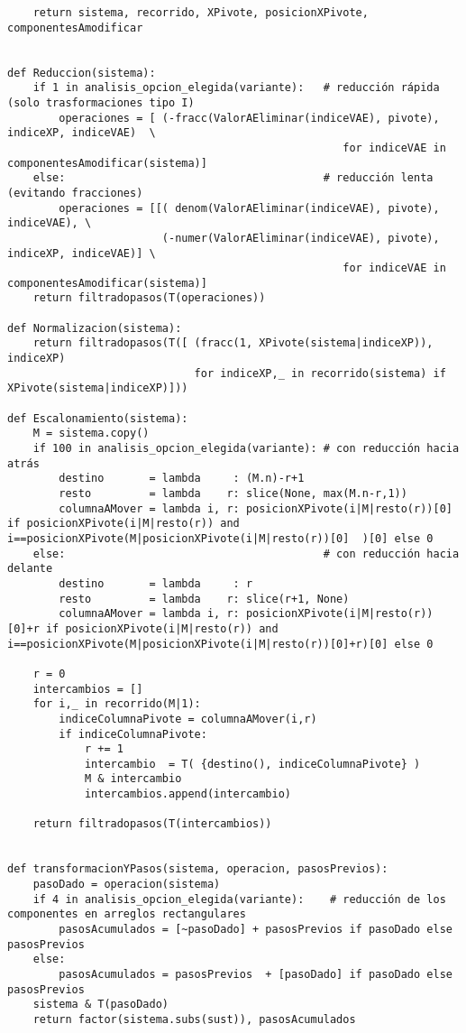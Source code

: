 \documentclass[11pt]{report}
\begin{document}
\begin{verbatim}
    return sistema, recorrido, XPivote, posicionXPivote, componentesAmodificar

    
def Reduccion(sistema):
    if 1 in analisis_opcion_elegida(variante):   # reducción rápida (solo trasformaciones tipo I)
        operaciones = [ (-fracc(ValorAEliminar(indiceVAE), pivote), indiceXP, indiceVAE)  \
                                                    for indiceVAE in componentesAmodificar(sistema)]
    else:                                        # reducción lenta (evitando fracciones)
        operaciones = [[( denom(ValorAEliminar(indiceVAE), pivote),           indiceVAE), \
                        (-numer(ValorAEliminar(indiceVAE), pivote), indiceXP, indiceVAE)] \
                                                    for indiceVAE in componentesAmodificar(sistema)]
    return filtradopasos(T(operaciones))

def Normalizacion(sistema):
    return filtradopasos(T([ (fracc(1, XPivote(sistema|indiceXP)), indiceXP)
                             for indiceXP,_ in recorrido(sistema) if XPivote(sistema|indiceXP)]))

def Escalonamiento(sistema):
    M = sistema.copy()
    if 100 in analisis_opcion_elegida(variante): # con reducción hacia atrás
        destino       = lambda     : (M.n)-r+1
        resto         = lambda    r: slice(None, max(M.n-r,1))
        columnaAMover = lambda i, r: posicionXPivote(i|M|resto(r))[0]   if posicionXPivote(i|M|resto(r)) and i==posicionXPivote(M|posicionXPivote(i|M|resto(r))[0]  )[0] else 0
    else:                                        # con reducción hacia delante
        destino       = lambda     : r
        resto         = lambda    r: slice(r+1, None)
        columnaAMover = lambda i, r: posicionXPivote(i|M|resto(r))[0]+r if posicionXPivote(i|M|resto(r)) and i==posicionXPivote(M|posicionXPivote(i|M|resto(r))[0]+r)[0] else 0

    r = 0
    intercambios = []
    for i,_ in recorrido(M|1):
        indiceColumnaPivote = columnaAMover(i,r)
        if indiceColumnaPivote:
            r += 1
            intercambio  = T( {destino(), indiceColumnaPivote} )
            M & intercambio
            intercambios.append(intercambio)
            
    return filtradopasos(T(intercambios))


def transformacionYPasos(sistema, operacion, pasosPrevios):
    pasoDado = operacion(sistema)
    if 4 in analisis_opcion_elegida(variante):    # reducción de los componentes en arreglos rectangulares
        pasosAcumulados = [~pasoDado] + pasosPrevios if pasoDado else pasosPrevios
    else:
        pasosAcumulados = pasosPrevios  + [pasoDado] if pasoDado else pasosPrevios
    sistema & T(pasoDado)
    return factor(sistema.subs(sust)), pasosAcumulados



\end{verbatim}
\end{document}
